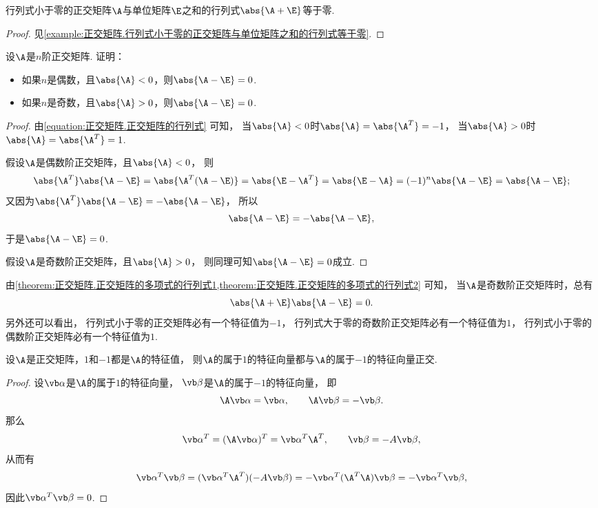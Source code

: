 \begin{proposition}\label{theorem:正交矩阵.正交矩阵的多项式的行列式1}
行列式小于零的正交矩阵\(\A\)与单位矩阵\(\E\)之和的行列式\(\abs{\A+\E}\)等于零.
\begin{proof}
见\cref{example:正交矩阵.行列式小于零的正交矩阵与单位矩阵之和的行列式等于零}.
\end{proof}
\end{proposition}
\begin{proposition}\label{theorem:正交矩阵.正交矩阵的多项式的行列式2}
设\(\A\)是\(n\)阶正交矩阵.
证明：\begin{itemize}
	\item 如果\(n\)是偶数，且\(\abs{\A}<0\)，则\(\abs{\A-\E} = 0\).
	\item 如果\(n\)是奇数，且\(\abs{\A}>0\)，则\(\abs{\A-\E} = 0\).
\end{itemize}
\begin{proof}
由\cref{equation:正交矩阵.正交矩阵的行列式} 可知，
当\(\abs{\A}<0\)时\(\abs{\A}=\abs{\A^T}=-1\)，
当\(\abs{\A}>0\)时\(\abs{\A}=\abs{\A^T}=1\).

假设\(\A\)是偶数阶正交矩阵，且\(\abs{\A}<0\)，
则\begin{align*}
	\abs{\A^T} \abs{\A-\E}
	= \abs{\A^T (\A-\E)}
	= \abs{\E-\A^T}
	= \abs{\E-\A}
	= (-1)^n \abs{\A-\E}
	= \abs{\A-\E};
\end{align*}
又因为\(\abs{\A^T} \abs{\A-\E} = -\abs{\A-\E}\)，
所以\begin{equation*}
	\abs{\A-\E}
	= -\abs{\A-\E},
\end{equation*}
于是\(\abs{\A-\E} = 0\).

假设\(\A\)是奇数阶正交矩阵，且\(\abs{\A}>0\)，
则同理可知\(\abs{\A-\E} = 0\)成立.
\end{proof}
\end{proposition}
\begin{remark}
由\cref{theorem:正交矩阵.正交矩阵的多项式的行列式1,theorem:正交矩阵.正交矩阵的多项式的行列式2} 可知，
当\(\A\)是奇数阶正交矩阵时，总有\[
	\abs{\A+\E} \abs{\A-\E} = 0.
\]
另外还可以看出，
行列式小于零的正交矩阵必有一个特征值为\(-1\)，
行列式大于零的奇数阶正交矩阵必有一个特征值为\(1\)，
行列式小于零的偶数阶正交矩阵必有一个特征值为\(1\).
\end{remark}
\begin{proposition}
设\(\A\)是正交矩阵，\(1\)和\(-1\)都是\(\A\)的特征值，
则\(\A\)的属于\(1\)的特征向量都与\(\A\)的属于\(-1\)的特征向量正交.
\begin{proof}
设\(\vb\alpha\)是\(\A\)的属于\(1\)的特征向量，
\(\vb\beta\)是\(\A\)的属于\(-1\)的特征向量，
即\[
	\A \vb\alpha = \vb\alpha,
	\qquad
	\A \vb\beta = -\vb\beta.
\]
那么\[
	\vb\alpha^T = (\A \vb\alpha)^T = \vb\alpha^T \A^T,
	\qquad
	\vb\beta = -A \vb\beta,
\]
从而有\[
	\vb\alpha^T \vb\beta
	= (\vb\alpha^T \A^T) (-A \vb\beta)
	= - \vb\alpha^T (\A^T \A) \vb\beta
	= - \vb\alpha^T \vb\beta,
\]
因此\(\vb\alpha^T \vb\beta = 0\).
\end{proof}
\end{proposition}

